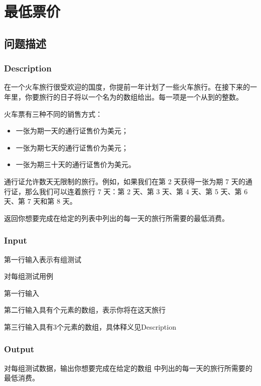 \newpage
\section{最低票价}
\subsection{问题描述}
\subsubsection*{Description}
在一个火车旅行很受欢迎的国度，你提前一年计划了一些火车旅行。在接下来的一年里，你要旅行的日子将以一个名为的数组给出。每一项是一个从到的整数。

火车票有三种不同的销售方式：

\begin{itemize}
    \item 一张为期一天的通行证售价为美元；
    \item 一张为期七天的通行证售价为美元；
    \item 一张为期三十天的通行证售价为美元。
\end{itemize}

通行证允许数天无限制的旅行。例如，如果我们在第 2 天获得一张为期 7 天的通行证，那么我们可以连着旅行 7 天：第 2 天、第 3 天、第 4 天、第 5 天、第 6 天、第 7 天和第 8 天。

返回你想要完成在给定的列表中列出的每一天的旅行所需要的最低消费。

\subsubsection*{Input}
第一行输入表示有组测试

对每组测试用例

第一行输入

第二行输入具有个元素的数组，表示你将在这天旅行

第三行输入具有3个元素的数组，具体释义见Description

\subsubsection*{Output}

对每组测试数据，输出你想要完成在给定的数组 中列出的每一天的旅行所需要的最低消费。

